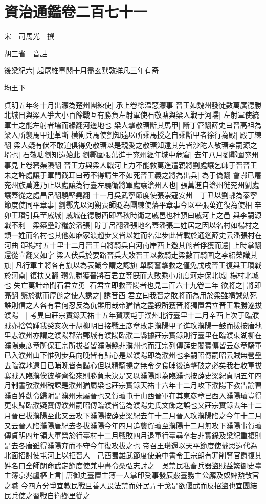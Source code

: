 \section{資治通鑑卷二百七十一}
宋　司馬光　撰

胡三省　音註

後梁紀六|{
	起屠維單閼十月盡玄黓敦牂凡三年有奇}


均王下

貞明五年冬十月出濛為楚州團練使|{
	承上卷徐温惡濛事}
晉王如魏州發徒數萬廣德勝北城日與梁人爭大小百餘戰互有勝負左射軍使石敬瑭與梁人戰于河壖|{
	左射軍使統軍士之能左射者壖而緣翻河邊地也}
梁人擊敬瑭斷其馬甲|{
	斷丁管翻薛史曰晉高祖為梁人所襲馬甲連革斷}
横衝兵馬使劉知遠以所乘馬授之自乘斷甲者徐行為殿|{
	殿丁練翻}
梁人疑有伏不敢迫俱得免敬瑭以是親愛之敬瑭知遠其先皆沙陀人敬瑭李嗣源之壻也|{
	石敬瑭劉知遠始此}
劉鄩圍張萬進于兖州經年城中危窘|{
	去年八月劉鄩圍兖州事見上卷窘渠隕翻}
晉王方與梁人戰河上力不能救萬進遣親將劉處讓乞師于晉晉王未之許處讓于軍門截耳曰苟不得請生不如死晉王義之將為出兵|{
	為于偽翻}
會鄩已屠兖州族萬進乃止以處讓為行臺左驍衛將軍處讓滄州人也|{
	張萬進自滄州徙兖州劉處讓蓋從之處昌呂翻驍堅堯翻}
十一月吳武寧節度使張崇寇安州　丁丑以劉鄩為泰寧節度使同平章事|{
	劉鄩先以河朔喪師貶為團練使落平章事今以平張萬進復為使相}
辛卯王瓚引兵至戚城|{
	戚城在德勝西即春秋時衛之戚邑也杜預曰戚河上之邑}
與李嗣源戰不利　梁築壘貯糧於潘張|{
	貯丁呂翻潘張地名蓋潘張二姓居之因以名村如楊村之類一姓而名村也其他如麻家渡趙步又皆以姓而名津步此皆載於通鑑薛史云潘張村在河曲}
距楊村五十里十二月晉王自將騎兵自河南岸西上邀其餉者俘獲而還|{
	上時掌翻還從宣翻又如字}
梁人伏兵於要路晉兵大敗晉王以數騎走梁數百騎圍之李紹榮識其旗|{
	凡行軍主將各有旗以為表識今謂之認旗}
單騎奮擊救之僅免戊戌晉王復與王瓚戰於河南|{
	復扶又翻}
瓚先勝獲晉將石君立等旣而大敗乘小舟度河走保北城|{
	楊村北城也}
失亡萬計帝聞石君立勇|{
	石君立即救晉陽者也見二百六十九卷二年}
欲將之|{
	將即亮翻}
繫於獄而厚餉之使人誘之|{
	誘音酉}
君立曰我晉之敗將而為用於梁雖竭誠効死誰則信之人各有君何忍反為仇讎用哉帝猶惜之盡殺所獲晋將獨置君立晋王乘勝遂拔濮陽　|{
	考異曰莊宗實錄天祐十五年賀瓌屯于濮州北行臺里十二月辛酉上次于臨濮賊亦捨營踵我癸亥次于胡柳明日接戰王彦章敗走濮陽甲子進攻濮陽一鼓而拔按唐地里志濮州亦謂之濮陽郡治鄄城有濮陽臨濮二縣據莊宗實錄則行臺里在臨濮東湖柳在濮陽東彦章所保莊宗所拔者皆濮陽縣非濮州也而莊宗列傳薛史閻寶傳皆云彦章騎軍已入濮州山下惟列步兵向晚皆有歸心是以濮陽即為濮州也李嗣昭傳嗣昭云賊無營壘去臨濮地遠日已晡晚皆有歸心但以精騎撓之無令夕食晡後追擊破之必矣我若收軍拔寨賊入臨濮俟彼整齊復來則勝負未決是又以濮陽即為臨濮也按薛史梁紀貞明五年四月制書攷濮州税課是濮州猶屬梁也莊宗實錄天祐十六年十二月攻下濮陽下教告諭曹濮百姓勸令歸附是濮州未屬晉也又賀瓌屯于山西晉軍在其東彦章已西入濮陽瓌豈得更東歸臨濮疑寶傳濮州嗣昭傳臨濮皆當為濮陽史氏文飾之誤也又莊宗實錄去年十二月晉已拔濮陽至此又云攻下濮陽按薛史梁紀去年十二月晉人攻濮陽陷之今年十二月又云晉人陷濮陽唐紀去冬拔濮陽今年四月追襲賀瓌至濮陽十二月無攻下濮陽事賀瓌傳貞明四年領大軍營於行臺村十二月戰敗四月退軍行臺尋卒若非實錄及梁紀重複則是去冬唐雖得濮陽弃而不守今年復攻拔之也}
帝召王瓚還以天平節度使戴思遠代為北面招討使屯河上以拒晉人　己酉蜀雄武節度使兼中書令王宗朗有罪削奪官爵復其姓名曰全師朗命武定節度使兼中書令桑弘志討之　吳禁民私畜兵器盜賊益繁御史臺主簿京兆盧樞上言|{
	唐御史臺置主薄一人掌印受事發辰覈臺務主公廨及奴婢勲散官之職}
今四方分爭宜教民戰且善人畏法禁而奸民弄干戈是欲偃武而反招盜也宜團結民兵使之習戰自衛鄉里從之

